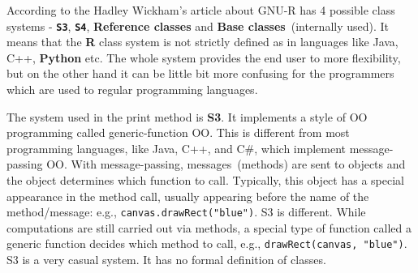 \documentclass[thesis=M,english]{FITthesis}[2018/10/20]
\newcommand{\code}[1]{\texttt{#1}}
\begin{document}
According to the Hadley Wickham's article about GNU-R has 4 possible class systems - \textbf{\code{S3}}, \textbf{\code{S4}}, \textbf{Reference classes} and \textbf{Base classes}~(internally used). It means that the \textbf{R} class system is not strictly defined as in languages like Java, C++, \textbf{Python} etc. The whole system provides the end user to more flexibility, but on the other hand it can be little bit more confusing for the programmers which are used to regular programming languages. 

The system used in the print method is \textbf{S3}. It implements a style of OO programming called generic-function OO. This is different from most programming languages, like Java, C++, and C{\#}, which implement message-passing OO. With message-passing, messages~(methods) are sent to objects and the object determines which function to call. Typically, this object has a special appearance in the method call, usually appearing before the name of the method/message: e.g., \code{canvas.drawRect("blue")}. S3 is different. While computations are still carried out via methods, a special type of function called a generic function decides which method to call, e.g., \code{drawRect(canvas, "blue")}. S3 is a very casual system. It has no formal definition of classes.






\end{document}

